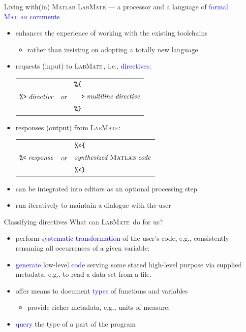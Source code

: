 \documentclass[]{beamer}
\newcommand{\pct}{\texttt{\symbol{37}}}
\newcommand{\dir}{\texttt{\symbol{62}}}
\newcommand{\res}{\texttt{\symbol{60}}}
\newcommand{\lcb}{\texttt{\symbol{123}}}
\newcommand{\rcb}{\texttt{\symbol{125}}}
\newcommand{\keyword}[1]{\textcolor{blue}{#1}}
\newcommand{\lr}{\textsc{LabMate}}
\newcommand{\ma}{\textsc{Matlab}}
\begin{document}
\begin{frame}[fragile]{Living with(in) \ma}
\lr{} --- a processor and a language of \keyword{formal \ma{} comments}
\pause
\begin{itemize}[<+->]
  \item enhances the experience of working with the existing toolchains
  \begin{itemize}
    \item rather than insisting on adopting a totally new language
  \end{itemize}
  \item requests (input) to \lr\,, i.e., \keyword{directives}:\\
  \begin{center}
  \begin{tabular}{p{8em}p{4em}l}
    &  & $\pct\lcb$ \\
    $\pct\dir\;\mathit{directive}$& or & $\quad\dir\;\mathit{multiline\;directive}$  \\
    &  & $\pct\rcb$ \\
  \end{tabular}
  \end{center}
  \item responses (output) from \lr:
  \begin{center}
  \begin{tabular}{p{8em}p{4em}p{9.3em}}
    &  & $\pct\res\lcb$ \\
    $\pct\res\;\mathit{response}$& or & $\mathit{synthesized}\; \ma\;\mathit{code}$  \\
    &  & $\pct\res\rcb$ \\
  \end{tabular}
  \end{center}
    \item can be integrated into editors as an optional processing step
  \item run iteratively to maintain a dialogue with the user
\end{itemize}
\end{frame}

\begin{frame}{Classifying directives}
  What can \lr\ do for us?\pause
\begin{itemize}[<+->]
  \item perform \keyword{systematic transformation} of the user's code, e.g., consistently renaming all occurrences of a given variable;
  \item \keyword{generate} low-level \keyword{code} serving some stated high-level purpose via supplied metadata, e.g., to read a data set from a file.
  \item offer means to document \keyword{types} of functions and variables
  \begin{itemize}
    \item provide richer metadata, e.g., units of measure;
  \end{itemize}
  \item \keyword{query} the type of a part of the program
\end{itemize}
\end{frame}
\end{document}
